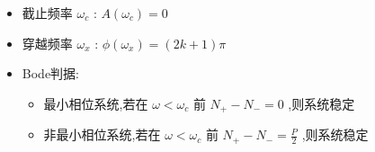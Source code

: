 \documentclass[table]{beamer}
\begin{document}
\begin{frame}
\begin{columns}
\begin{column}{0.5\textwidth}
\begin{block}
\begin{itemize}
\item 截止频率 $\omega_c$ : $A(\omega_c)=0$
\item 穿越频率 $\omega_x$ : $\phi(\omega_x)=(2k+1)\pi$
\item <3->Bode判据:
\begin{itemize}
\item 最小相位系统,若在 $\omega<\omega_c$ 前 $N_+-N_-=0$ ,则系统稳定
\item 非最小相位系统,若在 $\omega<\omega_c$ 前 $N_+-N_-=\frac{P}{2}$ ,则系统稳定
\end{itemize}
\end{itemize}
\end{block}
\end{column}
\end{columns}
\end{frame}
\end{document}
